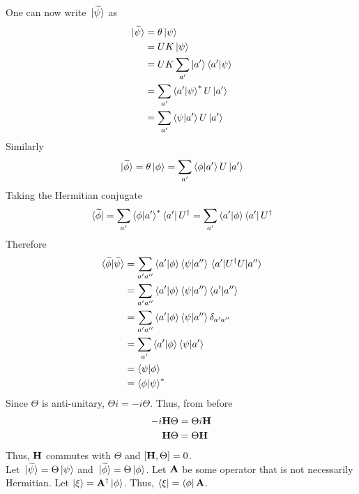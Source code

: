 \documentclass[12pt,a4paper,titlepage]{article}
\begin{document}
One can now write $\ket*{\widetilde{\psi}}$ as
\begin{equation}
\begin{aligned}
\ket*{\widetilde{\psi}}&=\theta\ket{\psi}\\
&=UK\ket{\psi}\\
&=UK\sum_{a'}\ket{a'}\ip{a'}{\psi}\\
&=\sum_{a'}\ip{a'}{\psi}^{*}U\ket{a'}\\
&=\sum_{a'}\ip{\psi}{a'}U\ket{a'}
\end{aligned}
\end{equation}
Similarly
\begin{equation}
\ket*{\widetilde{\phi}}=\theta\ket{\phi}=\sum_{a'}\ip{\phi}{a'}U\ket{a'}
\end{equation}
Taking the Hermitian conjugate
\begin{equation}
\bra*{\widetilde{\phi}}=\sum_{a'}\ip{\phi}{a'}^{*}\bra{a'}U^{\dagger}=\sum_{a'}\ip{a'}{\phi}\bra{a'}U^{\dagger}
\end{equation}
Therefore
\begin{equation}
\begin{aligned}
\ip*{\widetilde{\phi}}{\widetilde{\psi}}&=\sum_{a'a''}\ip{a'}{\phi}\ip{\psi}{a''}\mel{a'}{U^{\dagger}U}{a''}\\
&=\sum_{a'a''}\ip{a'}{\phi}\ip{\psi}{a''}\ip{a'}{a''}\\
&=\sum_{a'a''}\ip{a'}{\phi}\ip{\psi}{a''}\delta_{a'a''}\\
&=\sum_{a'}\ip{a'}{\phi}\ip{\psi}{a'}\\
&=\ip{\psi}{\phi}\\
&=\ip{\phi}{\psi}^{*}
\end{aligned}
\end{equation}
Since $\Theta$ is anti-unitary, $\Theta i=-i\Theta$. Thus, from before
\begin{equation}
\begin{aligned}
-i\vb{H}\Theta&=\Theta i\vb{H}\\
\vb{H}\Theta&=\Theta\vb{H}
\end{aligned}
\end{equation}
Thus, $\vb{H}$ commutes with $\Theta$ and $\comm{\vb{H}}{\Theta}=0$.\\

Let $\ket*{\widetilde{\psi}}=\Theta\ket{\psi}$ and $\ket*{\widetilde{\phi}}=\Theta\ket{\phi}$. Let $\vb{A}$ be some operator that is not necessarily Hermitian. Let $\ket{\xi}=\vb{A}^{\dagger}\ket{\phi}$. Thus, $\bra{\xi}=\bra{\phi}\vb{A}$.\\
\end{document}
